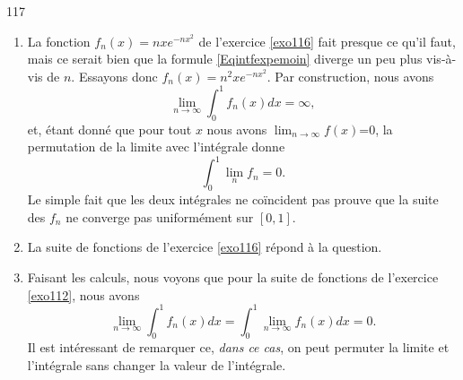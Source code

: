 

\begin{corrige}{117}

\begin{enumerate}
\item La fonction $f_n(x)=nx e^{-nx^2}$ de l'exercice \ref{exo116} fait presque ce qu'il faut, mais ce serait bien que la formule \eqref{Eqintfexpemoin} diverge un peu plus vis-à-vis de $n$. Essayons donc $f_n(x)=n^2x e^{-nx^2}$. Par construction, nous avons
\begin{equation}
	\lim_{n\to\infty}\int_0^1f_n(x)dx=\infty,
\end{equation}
et, étant donné que pour tout $x$ nous avons $\lim_{n\to\infty}f(x)$=0, la permutation de la limite avec l'intégrale donne
\begin{equation}
	\int_0^1\lim_{n}f_n=0.
\end{equation}
Le simple fait que les deux intégrales ne coïncident pas prouve que la suite des $f_n$ ne converge pas uniformément sur $[0,1]$.

\item La suite de fonctions de l'exercice \ref{exo116} répond à la question.

\item
    Faisant les calculs, nous voyons que pour la suite de fonctions de l'exercice \ref{exo112}, nous avons
\begin{equation}
	\lim_{n\to\infty}\int_0^1f_n(x)dx=\int_0^1\lim_{n\to\infty}f_n(x)dx=0.
\end{equation}
Il est intéressant de remarquer ce, \emph{dans ce cas}, on peut permuter la limite et l'intégrale sans changer la valeur de l'intégrale.
\end{enumerate}

\end{corrige}

